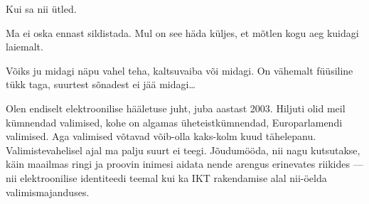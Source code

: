 


Kui sa nii ütled.


Ma ei oska ennast sildistada. Mul on see häda küljes, et mõtlen kogu aeg kuidagi 
laiemalt.


Võiks ju midagi näpu vahel teha, kaltsuvaiba või midagi. On vähemalt füüsiline tükk taga, 
suurtest sõnadest ei jää midagi\ldots


Olen endiselt elektroonilise hääletuse juht, juba aastast 2003. 
Hiljuti olid meil kümnendad valimised, kohe on algamas üheteistkümnendad, 
Europarlamendi valimised. Aga valimised võtavad võib-olla 
kaks-kolm kuud tähelepanu. Valimistevahelisel ajal ma palju 
suurt ei teegi. Jõudumööda, nii nagu kutsutakse, käin maailmas ringi ja proovin 
inimesi aidata nende arengus erinevates riikides --- nii 
elektroonilise identiteedi teemal kui ka IKT rakendamise alal 
nii-öelda valimismajanduses.

